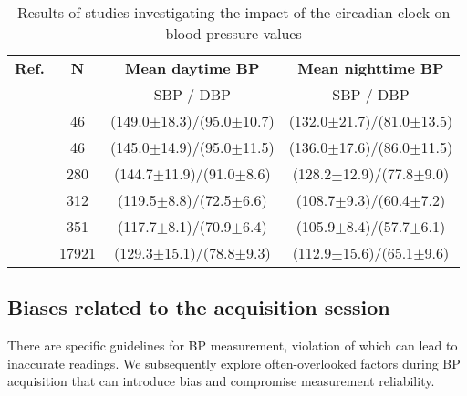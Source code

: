 \documentclass[journal,article,moreauthors]{Definitions/mdpi}
\begin{document}
\begin{table}[tb]
\caption{Results of studies investigating the impact of the circadian clock on blood pressure values}\label{Tab: cardiac}
\begin{center}
\begin{tabular}{rccc}
\toprule
\textbf{Ref.} & \textbf{N} & \textbf{Mean daytime BP}  & \textbf{Mean nighttime BP}\\
& & SBP / DBP & SBP / DBP
\\
\hline
\text{\citep{mayet1998ethnic}}&46&(149.0$\pm$18.3)/(95.0$\pm$10.7)&(132.0$\pm$21.7)/(81.0$\pm$13.5)\\
\hline
\text{\citep{mayet1998ethnic}}&46&(145.0$\pm$14.9)/(95.0$\pm$11.5)& (136.0$\pm$17.6)/(86.0$\pm$11.5)\\
\hline
\text{\citep{krzesinski2016diagnostic}}&280&(144.7$\pm$11.9)/(91.0$\pm$8.6)&(128.2$\pm$12.9)/(77.8$\pm$9.0)\\
\hline
\text{\citep{Wang2006-jk}}&312&(119.5$\pm$8.8)/(72.5$\pm$6.6)&(108.7$\pm$9.3)/(60.4$\pm$7.2)\\
\hline
\text{\citep{Wang2006-jk}}&351&(117.7$\pm$8.1)/(70.9$\pm$6.4)&(105.9$\pm$8.4)/(57.7$\pm$6.1)\\
\hline
\text{\citep{Li2019-ax}}&17921&(129.3$\pm$15.1)/(78.8$\pm$9.3)&(112.9$\pm$15.6)/(65.1$\pm$9.6)\\
\bottomrule
\end{tabular}
\end{center}
\end{table}


\subsection{Biases related to the acquisition session}
There are specific guidelines for BP measurement, violation of which can lead to inaccurate readings. We subsequently explore often-overlooked factors during BP acquisition that can introduce bias and compromise measurement reliability.
\end{document}
